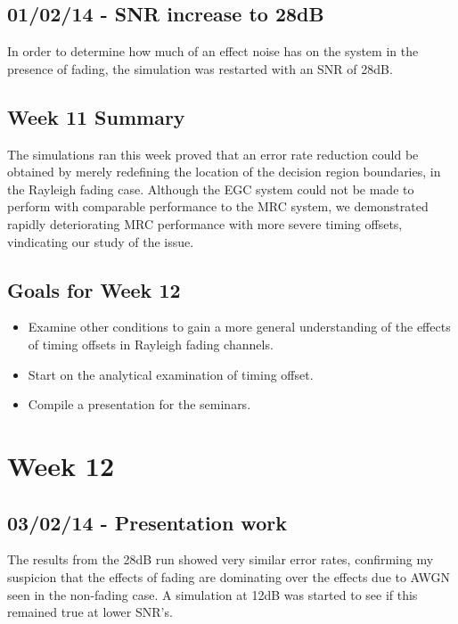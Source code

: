 \subsection{01/02/14 - SNR increase to 28dB}

In order to determine how much of an effect noise has on the system in
the presence of fading, the simulation was restarted with an SNR of
28dB.

\subsection{Week 11 Summary}

The simulations ran this week proved that an error rate reduction could
be obtained by merely redefining the location of the decision region
boundaries, in the Rayleigh fading case. Although the EGC system could
not be made to perform with comparable performance to the MRC system, we
demonstrated rapidly deteriorating MRC performance with more severe
timing offsets, vindicating our study of the issue.

\subsection{Goals for Week 12}

\begin{itemize}
\itemsep1pt\parskip0pt
\item
  Examine other conditions to gain a more general understanding of the
  effects of timing offsets in Rayleigh fading channels.
\item
  Start on the analytical examination of timing offset.
\item
  Compile a presentation for the seminars.
\end{itemize}

\section{Week 12}

\subsection{03/02/14 - Presentation work}

The results from the 28dB run showed very similar error rates,
confirming my suspicion that the effects of fading are dominating over
the effects due to AWGN seen in the non-fading case. A simulation at
12dB was started to see if this remained true at lower SNR's.

